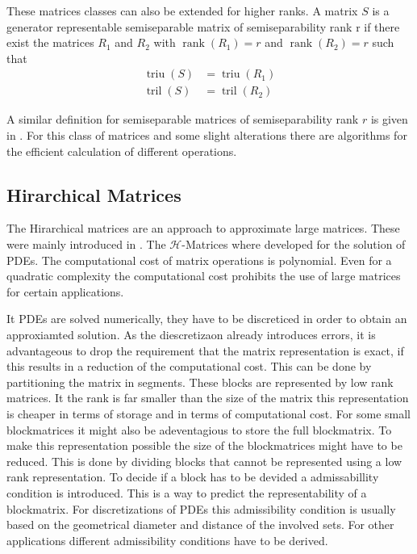 \documentclass[doctype=mastersthesis,BCOR=15mm,biblatex]{ldvbook}%
\DeclareMathOperator{\rank}{rank}
\DeclareMathOperator{\triu}{triu}
\DeclareMathOperator{\tril}{tril}
\begin{document}
These matrices classes can also be extended for higher ranks.
A matrix $S$ is a generator representable semiseparable matrix of semiseparability rank r if there exist the matrices $R_1$ and $R_2$ with $\rank(R_1)=r$ and $\rank(R_2)=r$ such that
\begin{align}
\triu(S) &= \triu(R_1)\\
\tril(S) &= \tril(R_2)
\end{align}

A similar definition for semiseparable matrices of semiseparability rank $r$ is given in \cite{vandebril_bibliography_2005}.
For this class of matrices and some slight alterations there are algorithms for the efficient calculation of different operations.

\subsection{Hirarchical Matrices}\label{subsec:H-mat}
The Hirarchical matrices are an approach to approximate large matrices. These were mainly introduced in \cite{grasedyck_theorie_2001,hackbusch_hierarchische_2009}.
The $\mathcal{H}$-Matrices where developed for the solution of PDEs.
The computational cost of matrix operations is polynomial. Even for a quadratic complexity the computational cost prohibits the use of large matrices for certain applications.

It PDEs are solved numerically, they have to be discreticed in order to obtain an approxiamted solution.
As the diescretizaon already introduces errors, it is advantageous to drop the requirement that the matrix representation is exact, if this results in a reduction of the computational cost.
This can be done by partitioning the matrix in segments. These blocks are represented by low rank matrices. It the rank is far smaller than the size of the matrix this representation is cheaper in terms of storage and in terms of computational cost.
For some small blockmatrices it might also be adeventagious to store the full blockmatrix.
To make this representation possible the size of the blockmatrices might have to be reduced.
This is done by dividing blocks that cannot be represented using a low rank representation.
To decide if a block has to be devided a admissabillity condition is introduced.
This is a way to predict the representability of a blockmatrix.
For discretizations of PDEs this admissibility condition is usually based on the geometrical diameter and distance of the involved sets.
For other applications different admissibility conditions have to be derived.
\end{document}
